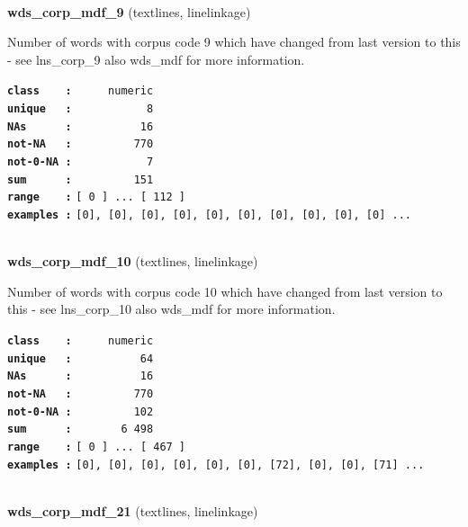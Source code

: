 \documentclass[]{article}
\begin{document}
~

\textbf{wds\_corp\_mdf\_9} (textlines, linelinkage)

Number of words with corpus code 9 which have changed from last version
to this - see lns\_corp\_9 also wds\_mdf for more information.

\textbf{\texttt{class\ \ \ \ :}} \texttt{~~~~~numeric}\\
\textbf{\texttt{unique\ \ \ :}} \texttt{~~~~~~~~~~~8}\\
\textbf{\texttt{NAs\ \ \ \ \ \ :}} \texttt{~~~~~~~~~~16}\\
\textbf{\texttt{not-NA\ \ \ :}} \texttt{~~~~~~~~~770}\\
\textbf{\texttt{not-0-NA\ :}} \texttt{~~~~~~~~~~~7}\\
\textbf{\texttt{sum\ \ \ \ \ \ :}} \texttt{~~~~~~~~~151}\\
\textbf{\texttt{range\ \ \ \ :}}
\texttt{{[}\ 0\ {]}\ ...\ {[}\ 112\ {]}}\\
\textbf{\texttt{examples\ :}}
\texttt{{[}0{]},\ {[}0{]},\ {[}0{]},\ {[}0{]},\ {[}0{]},\ {[}0{]},\ {[}0{]},\ {[}0{]},\ {[}0{]},\ {[}0{]}\ ...}\\

~

\textbf{wds\_corp\_mdf\_10} (textlines, linelinkage)

Number of words with corpus code 10 which have changed from last version
to this - see lns\_corp\_10 also wds\_mdf for more information.

\textbf{\texttt{class\ \ \ \ :}} \texttt{~~~~~numeric}\\
\textbf{\texttt{unique\ \ \ :}} \texttt{~~~~~~~~~~64}\\
\textbf{\texttt{NAs\ \ \ \ \ \ :}} \texttt{~~~~~~~~~~16}\\
\textbf{\texttt{not-NA\ \ \ :}} \texttt{~~~~~~~~~770}\\
\textbf{\texttt{not-0-NA\ :}} \texttt{~~~~~~~~~102}\\
\textbf{\texttt{sum\ \ \ \ \ \ :}} \texttt{~~~~~~~6~498}\\
\textbf{\texttt{range\ \ \ \ :}}
\texttt{{[}\ 0\ {]}\ ...\ {[}\ 467\ {]}}\\
\textbf{\texttt{examples\ :}}
\texttt{{[}0{]},\ {[}0{]},\ {[}0{]},\ {[}0{]},\ {[}0{]},\ {[}0{]},\ {[}72{]},\ {[}0{]},\ {[}0{]},\ {[}71{]}\ ...}\\

~

\textbf{wds\_corp\_mdf\_21} (textlines, linelinkage)
\end{document}
